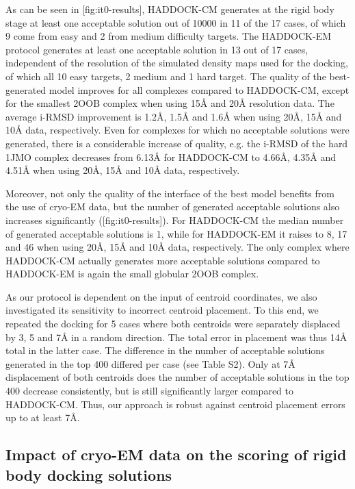 As can be seen in [fig:it0-results], HADDOCK-CM generates at the rigid body stage at least one acceptable solution out of 10000 in 11 of the 17 cases, of which 9 come from easy and 2 from medium difficulty targets. 
The HADDOCK-EM protocol generates at least one acceptable solution in 13 out of 17 cases, independent of the resolution of the simulated density maps used for the docking, of which all 10 easy targets, 2 medium and 1 hard target. 
The quality of the best-generated model improves for all complexes compared to HADDOCK-CM, except for the smallest 2OOB complex when using 15Å and 20Å resolution data. 
The average i-RMSD improvement is 1.2Å, 1.5Å and 1.6Å when using 20Å, 15Å and 10Å data, respectively. 
Even for complexes for which no acceptable solutions were generated, there is a considerable increase of quality, e.g. the i-RMSD of the hard 1JMO complex decreases from 6.13Å for HADDOCK-CM to 4.66Å, 4.35Å and 4.51Å when using 20Å, 15Å and 10Å data, respectively. 

Moreover, not only the quality of the interface of the best model benefits from the use of cryo-EM data, but the number of generated acceptable solutions also increases significantly ([fig:it0-results]).
For HADDOCK-CM the median number of generated acceptable solutions is 1, while for HADDOCK-EM it raises to 8, 17 and 46 when using 20Å, 15Å and 10Å data, respectively. 
The only complex where HADDOCK-CM actually generates more acceptable solutions compared to HADDOCK-EM is again the small globular 2OOB complex.

As our protocol is dependent on the input of centroid coordinates, we also investigated its sensitivity to incorrect centroid placement. 
To this end, we repeated the docking for 5 cases where both centroids were separately displaced by 3, 5 and 7Å in a random direction. 
The total error in placement was thus 14Å total in the latter case. The difference in the number of acceptable solutions generated in the top 400 differed per case (see Table S2). 
Only at 7Å displacement of both centroids does the number of acceptable solutions in the top 400 decrease consistently, but is still significantly larger compared to HADDOCK-CM. 
Thus, our approach is robust against centroid placement errors up to at least 7Å.

\subsection{Impact of cryo-EM data on the scoring of rigid body docking solutions}

